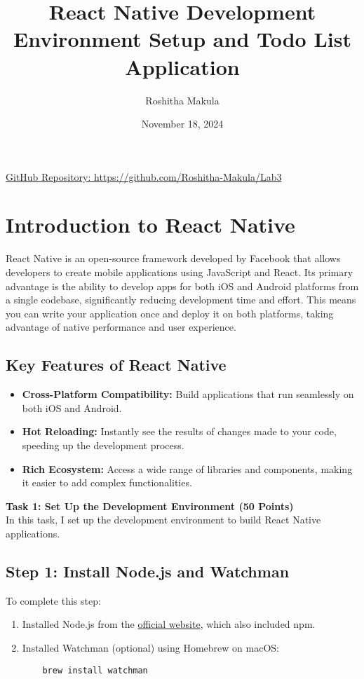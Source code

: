 \documentclass{article}
\title{React Native Development Environment Setup and Todo List Application}
\author{Roshitha Makula}
\date{November 18, 2024}
\begin{document}
\maketitle

\begin{center}
\href{https://github.com/Roshitha-Makula/Lab3}{GitHub Repository: https://github.com/Roshitha-Makula/Lab3}
\end{center}

\section{Introduction to React Native}
React Native is an open-source framework developed by Facebook that allows developers to create mobile applications using JavaScript and React. Its primary advantage is the ability to develop apps for both iOS and Android platforms from a single codebase, significantly reducing development time and effort. This means you can write your application once and deploy it on both platforms, taking advantage of native performance and user experience.

\subsection{Key Features of React Native}
\begin{itemize}
    \item \textbf{Cross-Platform Compatibility:} Build applications that run seamlessly on both iOS and Android.
    \item \textbf{Hot Reloading:} Instantly see the results of changes made to your code, speeding up the development process.
    \item \textbf{Rich Ecosystem:} Access a wide range of libraries and components, making it easier to add complex functionalities.
\end{itemize}


\noindent\textbf{\Large Task 1: Set Up the Development Environment (50 Points)}\\[0.5cm]
\noindent In this task, I set up the development environment to build React Native applications.\\[1cm]

\subsection{Step 1: Install Node.js and Watchman}
To complete this step:
\begin{enumerate}
    \item Installed Node.js from the \href{https://nodejs.org/en}{official website}, which also included npm.
    \item Installed Watchman (optional) using Homebrew on macOS:
    \begin{verbatim}
    brew install watchman
    \end{verbatim}
\end{enumerate}
\end{document}

